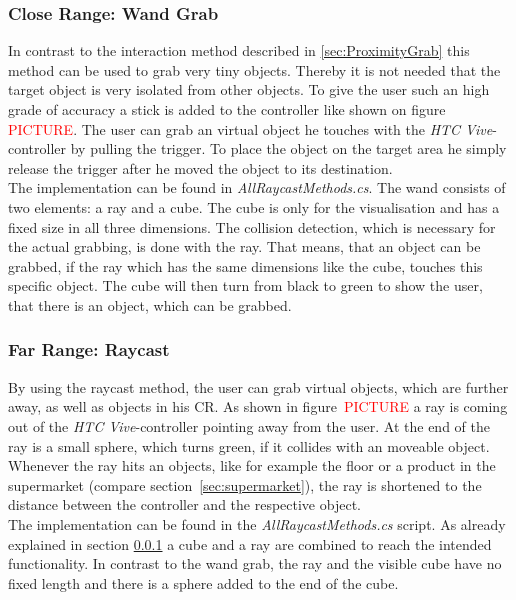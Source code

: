 \subsubsection{Close Range: Wand Grab} \label{sec:WandGrab}
In contrast to the interaction method described in \ref{sec:ProximityGrab} this method can be used to grab very tiny objects. Thereby it is not needed that the target object is very isolated from other objects. To give the user such an high grade of accuracy a stick is added to the controller like shown on figure \textcolor{red}{PICTURE}. The user can grab an virtual object he touches with the \textit{HTC Vive}-controller by pulling the trigger. To place the object on the target area he simply release the trigger after he moved the object to its destination. \\
The implementation can be found in \textit{AllRaycastMethods.cs}. The wand consists of two elements: a ray \cite{website:Ray} and a cube. The cube is only for the visualisation and has a fixed size in all three dimensions. The collision detection, which is necessary for the actual grabbing, is done with the ray. That means, that an object can be grabbed, if the ray which has the same dimensions like the cube, touches this specific object. The cube will then turn from black to green to show the user, that there is an object, which can be grabbed.

\subsubsection{Far Range: Raycast} \label{sec:Raycast}
By using the raycast method, the user can grab virtual objects, which are further away, as well as objects in his CR. As shown in figure~\textcolor{red}{PICTURE} a ray is coming out of the \textit{HTC Vive}-controller pointing away from the user. At the end of the ray is a small sphere, which turns green, if it collides with an moveable object. Whenever the ray hits an objects, like for example the floor or a product in the supermarket (compare section~\ref{sec:supermarket}), the ray is shortened to the distance between the controller and the respective object. \\
The implementation can be found in the \textit{AllRaycastMethods.cs} script. As already explained in section \ref{sec:WandGrab} a cube and a ray are combined to reach the intended functionality. In contrast to the wand grab, the ray and the visible cube have no fixed length and there is a sphere added to the end of the cube.


